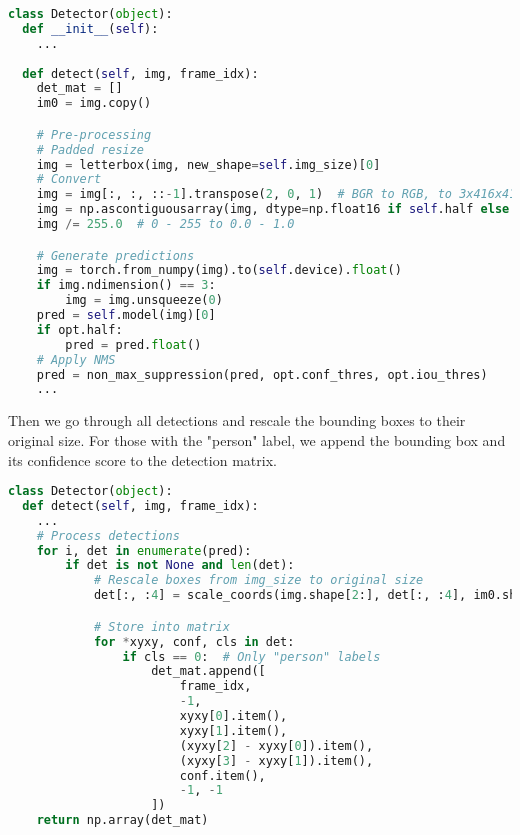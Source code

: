 \documentclass{article}
\numberwithin{algorithm}{section}
\begin{document}
\begin{lstlisting}[language=Python]
class Detector(object):
  def __init__(self):
    ...
  
  def detect(self, img, frame_idx):
    det_mat = []
    im0 = img.copy()

    # Pre-processing
    # Padded resize
    img = letterbox(img, new_shape=self.img_size)[0]
    # Convert
    img = img[:, :, ::-1].transpose(2, 0, 1)  # BGR to RGB, to 3x416x416
    img = np.ascontiguousarray(img, dtype=np.float16 if self.half else np.float32)  # uint8 to fp16/fp32
    img /= 255.0  # 0 - 255 to 0.0 - 1.0

    # Generate predictions
    img = torch.from_numpy(img).to(self.device).float()
    if img.ndimension() == 3:
        img = img.unsqueeze(0)
    pred = self.model(img)[0]
    if opt.half:
        pred = pred.float()
    # Apply NMS
    pred = non_max_suppression(pred, opt.conf_thres, opt.iou_thres)
    ...
\end{lstlisting}

Then we go through all detections and rescale the bounding boxes to their original size.
For those with the "person" label, we append the bounding box and its confidence score to the detection matrix.

\begin{lstlisting}[language=Python]
class Detector(object):
  def detect(self, img, frame_idx): 
    ...
    # Process detections
    for i, det in enumerate(pred):
        if det is not None and len(det):
            # Rescale boxes from img_size to original size
            det[:, :4] = scale_coords(img.shape[2:], det[:, :4], im0.shape).round()

            # Store into matrix
            for *xyxy, conf, cls in det:
                if cls == 0:  # Only "person" labels
                    det_mat.append([
                        frame_idx,
                        -1,
                        xyxy[0].item(),
                        xyxy[1].item(),
                        (xyxy[2] - xyxy[0]).item(),
                        (xyxy[3] - xyxy[1]).item(),
                        conf.item(),
                        -1, -1
                    ])
    return np.array(det_mat)
\end{lstlisting}
\end{document}
